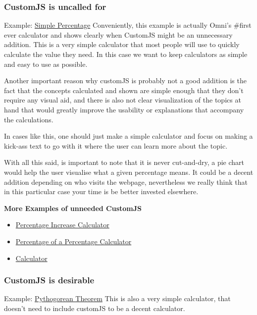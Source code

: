 \subsubsection{CustomJS is uncalled for}
\label{subsub:unneeded}
Example: \href{https://www.omnicalculator.com/all/percentage-app} {Simple Percentage}
Conveniently, this example is actually Omni's \#first ever calculator and shows clearly when CustomJS might be an unnecessary addition. This is a very simple calculator that most people will use to quickly calculate the value they need. In this case we want to keep calculators as simple and easy to use as possible. 

Another important reason why customJS is probably not a good addition is the fact that the concepts calculated and shown are simple enough that they don't require any visual aid, and there is also not clear visualization of the topics at hand that would greatly improve the usability or explanations that accompany the calculations. 

In cases like this, one should just make a simple calculator and focus on making a kick-ass text to go with it where the user can learn more about the topic. 

With all this said, is important to note that it is never cut-and-dry, a pie chart would help the user visualise what a given percentage means. It could be a decent addition depending on who visits the webpage, nevertheless we really think that in this particular case your time is be better invested elsewhere. 

\textbf{More Examples of unneeded CustomJS}
\begin{itemize}
    \item \href{https://www.omnicalculator.com/math/percentage-increase}{Percentage Increase Calculator}
    \item \href{https://www.omnicalculator.com/math/percentage-of-percentage}{Percentage of a Percentage Calculator}
    \item \href{URL}{Calculator}
\end{itemize}

\subsubsection{CustomJS is desirable}
\label{subsub:desireable}
Example: \href{https://www.omnicalculator.com/math/pythagorean-theorem}{Pythogorean Theorem}
This is also a very simple calculator, that doesn't need to include customJS to be a decent calculator. 

